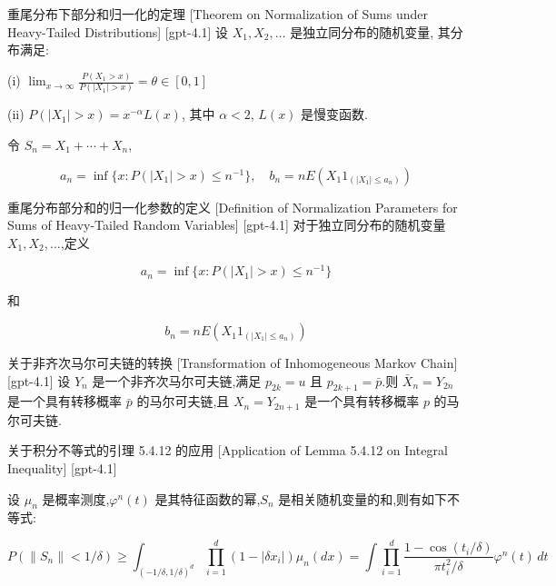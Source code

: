 \documentclass[UTF8]{ctexart}
\begin{document}
    
    
    \begin{thm}
        {重尾分布下部分和归一化的定理}
        [Theorem on Normalization of Sums under Heavy-Tailed Distributions]
        [gpt-4.1]
        设 $X_{1}, X_{2}, \dots$ 是独立同分布的随机变量, 其分布满足:

(i) $\operatorname{lim}_{x \to \infty} \frac{P(X_{1} > x)}{P(|X_{1}| > x)} = \theta \in [0,1]$ 

(ii) $P(|X_{1}| > x) = x^{-\alpha} L(x)$, 其中 $\alpha < 2$, $L(x)$ 是慢变函数.

令 $S_{n} = X_{1} + \cdots + X_{n}$,

\[
a_{n} = \operatorname{inf}\{x : P(|X_{1}| > x) \leq n^{-1}\}, \quad b_{n} = n E(X_{1} 1_{(|X_{1}| \leq a_{n})})
\]

    \end{thm}
    
    
    
    \begin{dfn}
        {重尾分布部分和的归一化参数的定义}
        [Definition of Normalization Parameters for Sums of Heavy-Tailed Random Variables]
        [gpt-4.1]
        对于独立同分布的随机变量 $X_{1}, X_{2}, \dots$,定义

\[
a_{n} = \operatorname{inf}\{x : P(|X_{1}| > x) \leq n^{-1}\}
\]

和

\[
b_{n} = n E(X_{1} 1_{(|X_{1}| \leq a_{n})})
\]

    \end{dfn}
    
    
    
    \begin{lma}
        {关于非齐次马尔可夫链的转换}
        [Transformation of Inhomogeneous Markov Chain]
        [gpt-4.1]
        设 $Y_n$ 是一个非齐次马尔可夫链,满足 $p_{2k} = 
u$ 且 $p_{2k+1} = \bar{p}$.则 $\bar{X}_n = Y_{2n}$ 是一个具有转移概率 $\bar{p}$ 的马尔可夫链,且 $X_n = Y_{2n+1}$ 是一个具有转移概率 $p$ 的马尔可夫链.
    \end{lma}
    
    
    
    \begin{lma}
        {关于积分不等式的引理 5.4.12 的应用}
        [Application of Lemma 5.4.12 on Integral Inequality]
        [gpt-4.1]
        
设 $\mu_n$ 是概率测度,$\varphi^n(t)$ 是其特征函数的幂,$S_n$ 是相关随机变量的和,则有如下不等式:

\[
P(\|S_n\| < 1/\delta) \geq \int_{(-1/\delta, 1/\delta)^d} \prod_{i=1}^d (1 - |\delta x_i|) \mu_n(dx) 
= \int \prod_{i=1}^d \frac{1 - \cos(t_i / \delta)}{\pi t_i^2 / \delta} \varphi^n(t) \, dt
\]

    \end{lma}
    
\end{document}
